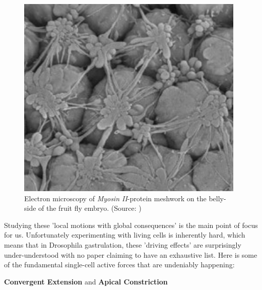 \begin{figure}[H]
    \centering
    \includegraphics[width=0.6\linewidth]{chapters/Theory/figures/EM_constricting_proteins.png}
    \caption{Electron microscopy of\textit{ Myosin II}-protein meshwork on the belly-side of the fruit fly embryo. (Source: )}
    \label{fig:mysosinMeshwork}
\end{figure}


Studying these 'local motions with global consequences' is the main point of focus for us. Unfortunately experimenting with living cells is inherently hard, which means that in Drosophila gastrulation, these 'driving effects' are surprisingly under-understood with no paper claiming to have an exhaustive list. Here is some of the fundamental single-cell active forces that are undeniably happening:

\textbf{Convergent Extension} and \textbf{Apical Constriction}

